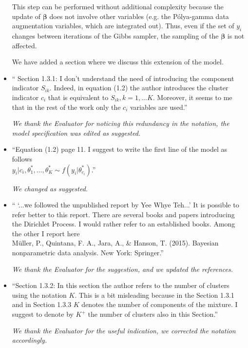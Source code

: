 \documentclass[11pt]{letter}
\begin{document}
\begin{itemize}
{\begin{enumerate}
		This step can be performed without additional complexity because the update of $\bm{\beta}$ does not involve other variables (e.g. the P\'olya-gamma data augmentation variables, which are integrated out). Thus, even if the set of $y_i$ changes between iterations of the Gibbs sampler, the sampling of the $\bm{\beta}$ is not affected.
	\end{enumerate}
	
	We have added a section where we discuss this extension of the model.
}
\vskip3mm

%
\item `` Section 1.3.1: 
I don't understand the need of introducing the component indicator $S_{ik}$. Indeed, in equation (1.2) the author introduces the cluster indicator $c_i$ that is equivalent to ${S_{ik},k=1,...K}$. Moreover, it seems to me that in the rest of the work only the $c_i$ variables are used.''
\vskip1mm

{\em 
	We thank the Evaluator for noticing this redundancy in the notation, the model specification was edited as suggested.
}
\vskip3mm

%
\item ``Equation (1.2) page 11.
I suggest to write the first line of the model as follows\\
$y_i|c_i,\theta^*_1,\dots,\theta^*_K \sim f(y_i|\theta^*_{c_i})$.''
\vskip1mm

{\em 
	We changed as suggested.
}
\vskip3mm

%
\item `` `...we followed the unpublished report by Yee Whye Teh...'
It is possible to refer better to this report. There are several books and papers introducing the Dirichlet Process. I would rather refer to an established books. Among the other I report here\\
M\"uller, P., Quintana, F. A., Jara, A., \& Hanson, T. (2015). Bayesian nonparametric data analysis. New York: Springer.''\vskip1mm

{\em 
	We thank the Evaluator for the suggestion, and we updated the references.
}
\vskip3mm

%
\item ``Section 1.3.2:
In this section the author refers to the number of clusters using the notation $K$. This is a bit misleading because in the Section 1.3.1 and in Section 1.3.3 $K$ denotes the number of components of the mixture. I suggest to denote by $K^+$ the number of clusters also in this Section.''\vskip1mm

{\em 
	We thank the Evaluator for the useful indication, we corrected the notation accordingly.
}
\vskip3mm


\end{itemize}
\end{document}
